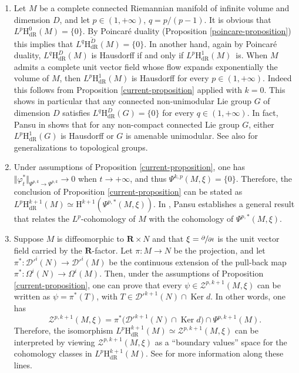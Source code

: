 \documentclass[JEP,XML,SOM,Unicode,published]{cedram}
\newcommand{\dR}{\mathrm{dR}}
\newcommand{\rH}{\mathrm{H}}
\newcommand{\RR}{\mathbf{R}}
\theoremstyle{plain}
\theoremstyle{remark}
\theoremstyle{definition}
\DeclareMathOperator{\Ker}{Ker}
\begin{document}
\label{example-complement}
\begin{enumerate}
\item\label{example-complement1}
Let $M$ be a complete connected Riemannian manifold of infinite volume and dimension $D$,
and let $p \in (1, +\infty)$, $q = p/(p-1)$.
It is obvious that $L^p \rH_\dR^0 (M) = \{0\}$. By Poincaré duality (Proposition \ref{poincare-proposition})
this implies that $L^q \overline{\rH^D_\dR} (M) = \{0\}.$
In another hand, again by Poincaré duality, $L^q \rH_\dR^D (M)$ is Hausdorff if and only if
$L^p \rH_\dR^1 (M)$~is. When $M$ admits a complete unit vector field whose flow expands exponentially the volume of $M$,
then $L^p \rH_\dR^1 (M)$ is Hausdorff for every $p \in (1, +\infty)$. Indeed this follows from Proposition
\ref{current-proposition} applied with $k=0$. This shows in particular that any connected non-unimodular Lie group $G$
of dimension $D$ satisfies $L^q \rH_\dR^D(G) = \{0\}$ for every $q \in (1, +\infty)$. In fact, Pansu in \cite[Th.\,1]{P2} shows that for any
non-compact connected Lie group $G$, either $L^p \rH_\dR^1(G)$ is Hausdorff
or $G$ is amenable unimodular. See also \cite{T} for generalizations to topological groups.

\item\label{example-complement2}
Under assumptions of Proposition \ref{current-proposition}, one has
$\Vert \varphi_t^* \Vert_{\Psi^{p,k} \to \Psi^{p,k}} \to 0$ when $t \to +\infty$, and thus
$\Psi^{k,p}(M, \xi) = \{0\}$.
Therefore, the conclusion of Proposition \ref{current-proposition} can be stated as
$L^p \rH_\dR^{k+1} (M) \simeq \rH^{k+1} (\Psi^{p,*}(M, \xi))$.
In \cite[Th.\,4]{Pa09}, Pansu establishes a general result that relates the $L^p$\nobreakdash-cohomology of $M$
with the cohomology of $\Psi^{p,*}(M, \xi)$.

\item\label{example-complement3}
Suppose $M$ is diffeomorphic to $\RR \times N$ and that $\xi = \sfrac{\partial}{\partial t}$ is the unit vector field carried by the $\RR$-factor. Let $\pi: M \to N$ be the projection,
and let $\pi^*: \mathcal D'^i(N) \to \mathcal D'^i(M)$ be the continuous extension of the pull-back map $\pi^*: \Omega^i(N) \to \Omega^i (M)$. Then, under the assumptions of Proposition
\ref{current-proposition}, one can prove that every $\psi \in \mathcal Z^{p,k+1}(M, \xi)$ can be
written as $\psi = \pi^*(T)$, with $T \in \mathcal D'^{k+1}(N) \cap \Ker d$. In other words, one has
\[\mathcal Z^{p,k+1}(M, \xi) = \pi^* \bigl(\mathcal D'^{k+1}(N) \cap \Ker d\bigr) \cap \Psi^{p, k+1}(M).\]
Therefore, the isomorphism $L^p \rH_\dR^{k+1} (M) \simeq \mathcal Z^{p,k+1} (M, \xi)$ can be interpreted by viewing $\mathcal Z^{p,k+1}(M, \xi)$ as a ``boundary values'' space for the
cohomology classes in $L^p \rH_\dR^{k+1} (M)$. See \cite{Pa09} for more information along these lines.
\end{enumerate}
\end{document}
